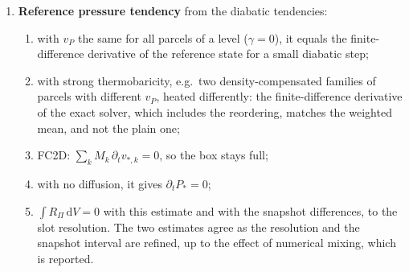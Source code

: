 \documentclass[11pt,a4paper]{article}
\begin{document}
\begin{enumerate}
  \item\label{test:weights} \textbf{Reference pressure tendency} from the diabatic tendencies:
        \begin{enumerate}
          \item with $v_P$ the same for all parcels of a level ($\gamma=0$), it equals the finite-difference derivative of the
                reference state for a small diabatic step;
          \item with strong thermobaricity, e.g.\ two density-compensated families of parcels with different $v_P$, heated
                differently: the finite-difference derivative of the exact solver, which includes the reordering, matches
                the weighted mean, and not the plain one;
          \item FC2D: $\sum_kM_k\,\partial_tv_{*,k}=0$, so the box stays full;
          \item with no diffusion, it gives $\partial_tP_*=0$;
          \item $\int R_\Pi\,\mathrm{d}V=0$ with this estimate and with the snapshot differences, to the slot resolution. The two
                estimates agree as the resolution and the snapshot interval are refined, up to the effect of numerical
                mixing, which is reported.
        \end{enumerate}
\end{enumerate}

\end{document}
